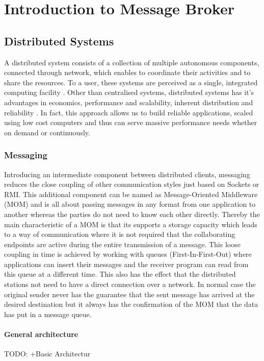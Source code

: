 \chapter{Introduction to Message Broker} 
\section{Distributed Systems} 
A distributed system consists of a collection of multiple autonomous components,
connected through network, which enables to coordinate their activities and to
share the resources. To a user, these systems are perceived as a single,
integrated computing facility \cite{TAN06}. Other than centralised systems,
distributed systems has it's advantages in economics, performance and
scalability, inherent distribution and reliability \cite{POSA1}.
In fact, this approach allows us to build reliable applications, 
scaled using low cost computers and thus can serve massive performance needs 
whether on demand or continuously.

\subsection{Messaging} 
Introducing an intermediate component between distributed
clients, messaging reduces the close coupling of other communication styles just
based on Sockets or RMI. This additional component can be named as
Message-Oriented Middleware (MOM) and is all about passing messages in any
format from one application to another whereas the parties do not need to know
each other directly. Thereby the main characteristic of a MOM is that its
supports a storage capacity which leads to a way of communication where it is
not required that the collaborating endpoints are active during the entire
transmission of a message. This loose coupling in time is achieved by
working with queues (First-In-First-Out) where applications can insert their
messages and the receiver program can read from this queue at a different time.
This also has the effect that the distributed stations not need to
have a direct connection over a network. In normal case the original sender
never has the guarantee that the sent message has arrived at the desired
destination but it always has the confirmation of the MOM that the data has put
in a message queue.  \cite{TAN06} \cite{PprIBMIntro}
 
\subsubsection{General architecture}
TODO: +Basic Architectur 

